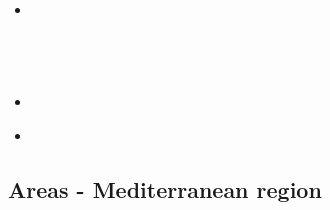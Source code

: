 \begin{scriptsize}
\begin{itemize}
\textcite{rors19} 
\textcite{stsh19} 
\item[\twothousandtwenty] 
\textcite{kids20} \\
\textcite{rozr20} \\
\textcite{relr20} \\
\textcite{aslr20} \\
\item[\twothousandtwentyone] 
\textcite{gupg21} \\
\item[\twothousandtwentytwo] 
\textcite{vavw22} \\
\end{itemize}
\end{scriptsize}

\subsection{Areas - Mediterranean region}

